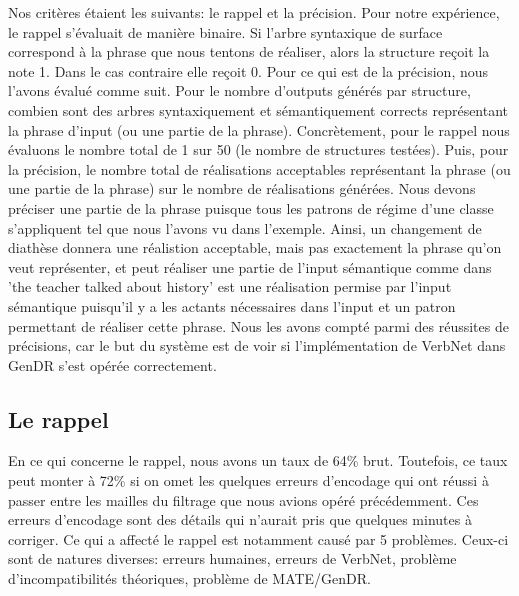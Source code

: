 Nos critères étaient les suivants: le rappel et la précision. Pour notre expérience, le rappel s'évaluait de manière binaire. Si l'arbre syntaxique de surface correspond à la phrase que nous tentons de réaliser, alors la structure reçoit la note 1. Dans le cas contraire elle reçoit 0. Pour ce qui est de la précision, nous l'avons évalué comme suit. Pour le nombre d'outputs générés par structure, combien sont des arbres syntaxiquement et sémantiquement corrects représentant la phrase d'input (ou une partie de la phrase). Concrètement, pour le rappel nous évaluons le nombre total de 1 sur 50 (le nombre de structures testées). Puis, pour la précision, le nombre total de réalisations acceptables représentant la phrase (ou une partie de la phrase) sur le nombre de réalisations générées. Nous devons préciser une partie de la phrase puisque tous les patrons de régime d'une classe s'appliquent tel que nous l'avons vu dans l'exemple. Ainsi, un changement de diathèse donnera une réalistion acceptable, mais pas exactement la phrase qu'on veut représenter, et peut réaliser une partie de l'input sémantique comme dans 'the teacher talked about history' est une réalisation permise par l'input sémantique puisqu'il y a les actants nécessaires dans l'input et un patron permettant de réaliser cette phrase. Nous les avons compté parmi des réussites de précisions, car le but du système est de voir si l'implémentation de VerbNet dans GenDR s'est opérée correctement.

\subsection{Le rappel}

En ce qui concerne le rappel, nous avons un taux de 64\% brut. Toutefois, ce taux peut monter à 72\% si on omet les quelques erreurs d'encodage qui ont réussi à passer entre les mailles du filtrage que nous avions opéré précédemment. Ces erreurs d'encodage sont des détails qui n'aurait pris que quelques minutes à corriger. Ce qui a affecté le rappel est notamment causé par 5 problèmes. Ceux-ci sont de natures diverses: erreurs humaines, erreurs de VerbNet, problème d'incompatibilités théoriques, problème de MATE/GenDR.

